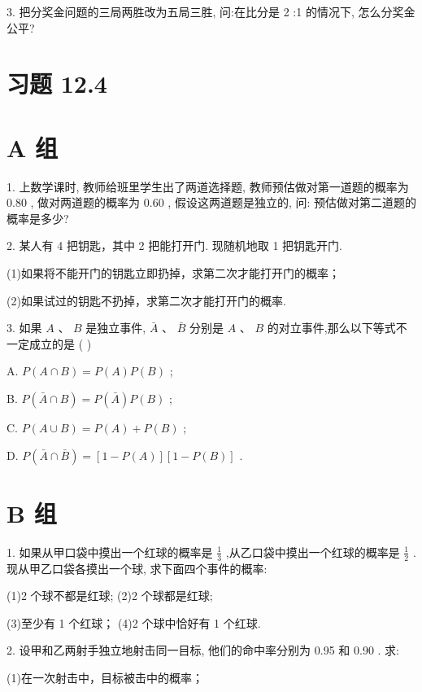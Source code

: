 \documentclass[10pt]{article}
\begin{document}
3. 把分奖金问题的三局两胜改为五局三胜, 问:在比分是 2 :1 的情况下, 怎么分奖金公平?



\section*{习题 12.4}

\section*{A 组}

1. 上数学课时, 教师给班里学生出了两道选择题, 教师预估做对第一道题的概率为 0.80 , 做对两道题的概率为 0.60 , 假设这两道题是独立的, 问: 预估做对第二道题的概率是多少?

2. 某人有 4 把钥匙，其中 2 把能打开门. 现随机地取 1 把钥匙开门.

(1)如果将不能开门的钥匙立即扔掉，求第二次才能打开门的概率；

(2)如果试过的钥匙不扔掉，求第二次才能打开门的概率.

3. 如果 \(A\text{ 、 }B\) 是独立事件, \(\bar{A}\text{ 、 }\bar{B}\) 分别是 \(A\text{ 、 }B\) 的对立事件,那么以下等式不一定成立的是 ( )

A. \(P\left( {A \cap  B}\right)  = P\left( A\right) P\left( B\right)\) ;

B. \(P\left( {\bar{A} \cap  B}\right)  = P\left( \bar{A}\right) P\left( B\right)\) ;

C. \(P\left( {A \cup  B}\right)  = P\left( A\right)  + P\left( B\right)\) ;

D. \(P\left( {\bar{A} \cap  \bar{B}}\right)  = \left\lbrack  {1 - P\left( A\right) }\right\rbrack  \left\lbrack  {1 - P\left( B\right) }\right\rbrack\) .

\section*{B 组}

1. 如果从甲口袋中摸出一个红球的概率是 \(\frac{1}{3}\) ,从乙口袋中摸出一个红球的概率是 \(\frac{1}{2}\) . 现从甲乙口袋各摸出一个球, 求下面四个事件的概率:

(1)2 个球不都是红球; (2)2 个球都是红球;

(3)至少有 1 个红球； (4)2 个球中恰好有 1 个红球.

2. 设甲和乙两射手独立地射击同一目标, 他们的命中率分别为 0.95 和 0.90 . 求:

(1)在一次射击中，目标被击中的概率；
\end{document}
